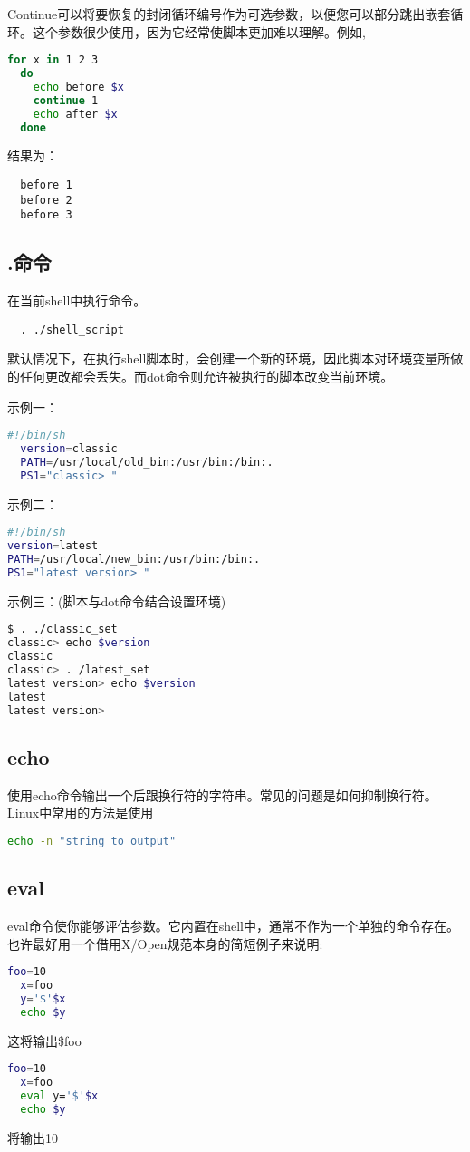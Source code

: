 \documentclass[a4paper]{ctexart}
\begin{document}
Continue可以将要恢复的封闭循环编号作为可选参数，以便您可以部分跳出嵌套循环。这个参数很少使用，因为它经常使脚本更加难以理解。例如,
\begin{lstlisting}[language=sh]
  for x in 1 2 3
  do
    echo before $x
    continue 1
    echo after $x
  done
\end{lstlisting}
结果为：
\begin{lstlisting}
  before 1
  before 2
  before 3
\end{lstlisting}

\subsection{.命令}
在当前shell中执行命令。
\begin{lstlisting}
  . ./shell_script
\end{lstlisting}
默认情况下，在执行shell脚本时，会创建一个新的环境，因此脚本对环境变量所做的任何更改都会丢失。而dot命令则允许被执行的脚本改变当前环境。

示例一：
\begin{lstlisting}[language=sh]
  #!/bin/sh
  version=classic
  PATH=/usr/local/old_bin:/usr/bin:/bin:.
  PS1="classic> "
\end{lstlisting}

示例二：
\begin{lstlisting}[language=sh]
#!/bin/sh
version=latest
PATH=/usr/local/new_bin:/usr/bin:/bin:.
PS1="latest version> "
\end{lstlisting}

示例三：(脚本与dot命令结合设置环境)
\begin{lstlisting}[language=sh]
$ . ./classic_set
classic> echo $version
classic
classic> . /latest_set
latest version> echo $version
latest
latest version>
\end{lstlisting}

\subsection{echo}
使用echo命令输出一个后跟换行符的字符串。常见的问题是如何抑制换行符。Linux中常用的方法是使用
\begin{lstlisting}[language=sh]
  echo -n "string to output"
\end{lstlisting}

\subsection{eval}
eval命令使你能够评估参数。它内置在shell中，通常不作为一个单独的命令存在。也许最好用一个借用X/Open规范本身的简短例子来说明: 
\begin{lstlisting}[language=sh]
  foo=10
  x=foo
  y='$'$x
  echo $y
\end{lstlisting}
这将输出\$foo
\begin{lstlisting}[language=sh]
  foo=10
  x=foo
  eval y='$'$x
  echo $y
\end{lstlisting}
将输出10
\end{document}

